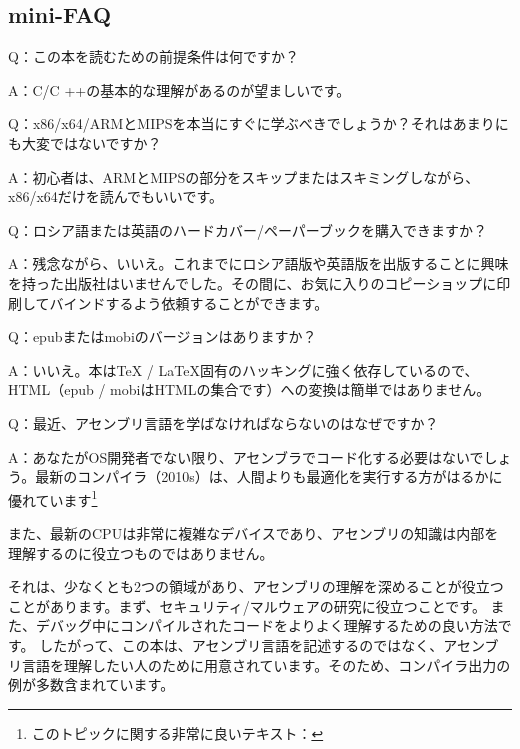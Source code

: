 \subsection*{mini-FAQ}


\par Q：この本を読むための前提条件は何ですか？
\par A：C/C ++の基本的な理解があるのが望ましいです。

\par Q：x86/x64/ARMとMIPSを本当にすぐに学ぶべきでしょうか？それはあまりにも大変ではないですか？
\par A：初心者は、ARMとMIPSの部分をスキップまたはスキミングしながら、x86/x64だけを読んでもいいです。

\par Q：ロシア語または英語のハードカバー/ペーパーブックを購入できますか？
\par A：残念ながら、いいえ。これまでにロシア語版や英語版を出版することに興味を持った出版社はいませんでした。その間に、お気に入りのコピーショップに印刷してバインドするよう依頼することができます。

\par Q：epubまたはmobiのバージョンはありますか？
\par A：いいえ。本はTeX / LaTeX固有のハッキングに強く依存しているので、HTML（epub / mobiはHTMLの集合です）への変換は簡単ではありません。

\par Q：最近、アセンブリ言語を学ばなければならないのはなぜですか？
\par A：あなたが\ac{OS}開発者でない限り、アセンブラでコード化する必要はないでしょう。最新のコンパイラ（2010s）は、人間よりも最適化を実行する方がはるかに優れています\footnote{このトピックに関する非常に良いテキスト：\InSqBrackets{\AgnerFog}}

また、最新のCPUは非常に複雑なデバイスであり、アセンブリの知識は内部を理解するのに役立つものではありません。

それは、少なくとも2つの領域があり、アセンブリの理解を深めることが役立つことがあります。まず、セキュリティ/マルウェアの研究に役立つことです。 また、デバッグ中にコンパイルされたコードをよりよく理解するための良い方法です。 したがって、この本は、アセンブリ言語を記述するのではなく、アセンブリ言語を理解したい人のために用意されています。そのため、コンパイラ出力の例が多数含まれています。

